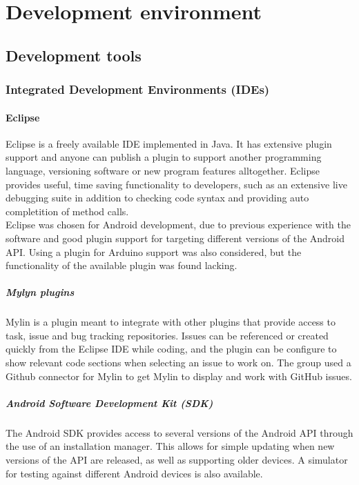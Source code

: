 \chapter{Development environment}
\section{Development tools}
\subsection{Integrated Development Environments (IDEs)}
\subsubsection{Eclipse}
Eclipse is a freely available IDE implemented in Java. It has extensive plugin support and anyone can publish a plugin to support another programming language, versioning software or new program features alltogether. Eclipse provides useful, time saving functionality to developers, such as an extensive live debugging suite in addition to checking code syntax and providing auto completition of method calls.\\
Eclipse was chosen for Android development, due to previous experience with the software and good plugin support for targeting different versions of the Android API. Using a plugin for Arduino support was also considered, but the functionality of the available plugin was found lacking. %

\paragraph{Mylyn plugins}
Mylin is a plugin meant to integrate with other plugins that provide access to task, issue and bug tracking repositories. Issues can be referenced or created quickly from the Eclipse IDE while coding, and the plugin can be configure to show relevant code sections when selecting an issue to work on. The group used a Github connector for Mylin to get Mylin to display and work with GitHub issues.

\paragraph{Android Software Development Kit (SDK)}
The Android SDK provides access to several versions of the Android API through the use of an installation manager. This allows for simple updating when new versions of the API are released, as well as supporting older devices. A simulator for testing against different Android devices is also available.


